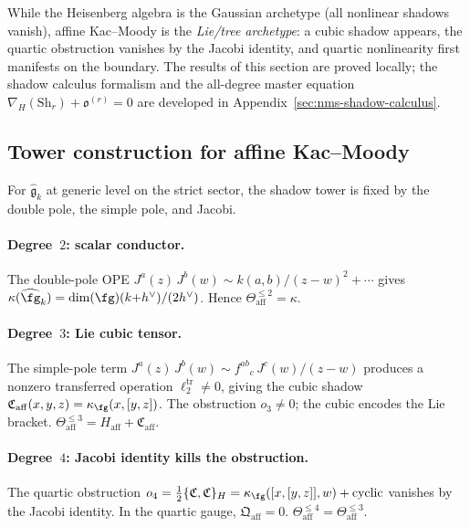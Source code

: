 While the Heisenberg algebra is the Gaussian archetype
(all nonlinear shadows vanish), affine Kac--Moody is the
\emph{Lie/tree archetype}: a cubic shadow appears, the quartic
obstruction vanishes by the Jacobi identity, and quartic
nonlinearity first manifests on the boundary. The results of this
section are proved locally; the shadow calculus formalism and the
all-degree master equation $\nabla_H(\mathrm{Sh}_r) + \mathfrak{o}^{(r)} = 0$
are developed in Appendix~\ref{sec:nms-shadow-calculus}.

\subsection{Tower construction for affine Kac--Moody}
\label{subsec:affine-tower-construction}

For $\widehat{\mathfrak{g}}_k$ at generic level on the strict
sector, the shadow tower is fixed by the double pole, the simple
pole, and Jacobi.

\paragraph{Degree~$2$: scalar conductor.}
The double-pole OPE
$J^a(z)\,J^b(w) \sim k(a,b)/(z{-}w)^2 + \cdots$
gives $\kappa(\widehat{\fg}_k) = \dim(\fg)(k{+}h^\vee)/(2h^\vee)$.
Hence $\Theta_{\mathrm{aff}}^{\leq 2} = \kappa$.

\paragraph{Degree~$3$: Lie cubic tensor.}
The simple-pole term
$J^a(z)\,J^b(w) \sim f^{ab}{}_c\,J^c(w)/(z{-}w)$
produces a nonzero transferred operation
$\ell_2^{\mathrm{tr}} \neq 0$, giving the cubic shadow
$\mathfrak{C}_{\mathrm{aff}}(x,y,z) = \kappa_{\fg}(x,[y,z])$.
The obstruction $o_3 \neq 0$; the cubic encodes the Lie bracket.
$\Theta_{\mathrm{aff}}^{\leq 3}
= H_{\mathrm{aff}} + \mathfrak{C}_{\mathrm{aff}}$.

\paragraph{Degree~$4$: Jacobi identity kills the
obstruction.}
The quartic obstruction
$o_4 = \tfrac12\{\mathfrak{C},\mathfrak{C}\}_H
= \kappa_{\fg}([x,[y,z]],w) + \mathrm{cyclic}$
vanishes by the Jacobi identity.
In the quartic gauge, $\mathfrak{Q}_{\mathrm{aff}} = 0$.
$\Theta_{\mathrm{aff}}^{\leq 4} = \Theta_{\mathrm{aff}}^{\leq 3}$.

